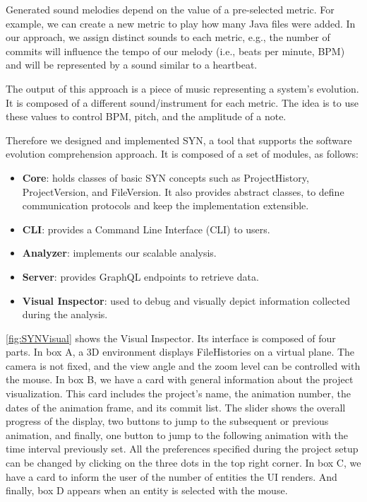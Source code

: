 \documentclass[11pt,twoside,english,singlespacing,headsepline,consistentlayout]{auxiliary/si-msc-thesis}
\begin{document}
Generated sound melodies depend on the value of a pre-selected metric. For example, we can create a new metric to play how many Java files were added. In our approach, we assign distinct sounds to each metric, e.g., the number of commits will influence the tempo of our melody (i.e., beats per minute, BPM) and will be represented by a sound similar to a heartbeat.

The output of this approach is a piece of music representing a system's evolution. It is composed of a different sound/instrument for each metric. The idea is to use these values to control BPM, pitch, and the amplitude of a note. 

Therefore we designed and implemented SYN, a tool that supports the software evolution comprehension approach. 
It is composed of a set of modules, as follows:
\begin{itemize}
    \item \textbf{Core}: holds classes of basic SYN concepts such as ProjectHistory, ProjectVersion, and FileVersion. It also provides abstract classes, to define communication protocols and keep the implementation extensible.
    \item \textbf{CLI}: provides a Command Line Interface (CLI) to users.
    \item \textbf{Analyzer}: implements our scalable analysis. 
    \item \textbf{Server}: provides GraphQL endpoints to retrieve data. 
    \item \textbf{Visual Inspector}: used to debug and visually depict information collected during the analysis.
\end{itemize}  

\autoref{fig:SYNVisual} shows the Visual Inspector. Its interface is composed of four parts.
In box A, a 3D environment displays FileHistories on a virtual plane. The camera is not fixed, and the view angle and the zoom level can be controlled with the mouse. 
In box B, we have a card with general information about the project visualization. 
This card includes the project's name, the animation number, the dates of the animation frame, and its commit list. The slider shows the overall progress of the display, two buttons to jump to the subsequent or previous animation, and finally, one button to jump to the following animation with the time interval previously set. 
All the preferences specified during the project setup can be changed by clicking on the three dots in the top right corner.
In box C, we have a card to inform the user of the number of entities the UI renders. 
And finally, box D appears when an entity is selected with the mouse. 
\end{document}

